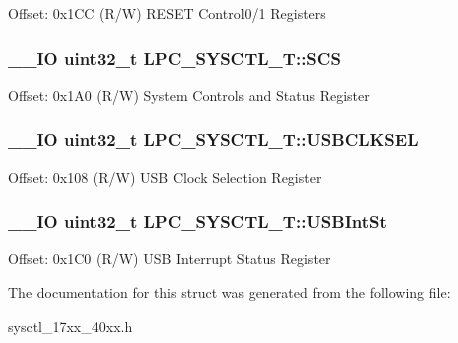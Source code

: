 Offset\+: 0x1\+C\+C (R/\+W) R\+E\+S\+E\+T Control0/1 Registers \hypertarget{struct_l_p_c___s_y_s_c_t_l___t_a90bf168dbcc04b27d230b74b5e4d17a6}{
\subsubsection[{S\+C\+S}]{\setlength{\rightskip}{0pt plus 5cm}\+\_\+\+\_\+\+I\+O uint32\+\_\+t L\+P\+C\+\_\+\+S\+Y\+S\+C\+T\+L\+\_\+\+T\+::\+S\+C\+S}}\label{struct_l_p_c___s_y_s_c_t_l___t_a90bf168dbcc04b27d230b74b5e4d17a6}
Offset\+: 0x1\+A0 (R/\+W) System Controls and Status Register \hypertarget{struct_l_p_c___s_y_s_c_t_l___t_a6d004c6e6657a7fe78e75bd3e3ea00c4}{
\subsubsection[{U\+S\+B\+C\+L\+K\+S\+E\+L}]{\setlength{\rightskip}{0pt plus 5cm}\+\_\+\+\_\+\+I\+O uint32\+\_\+t L\+P\+C\+\_\+\+S\+Y\+S\+C\+T\+L\+\_\+\+T\+::\+U\+S\+B\+C\+L\+K\+S\+E\+L}}\label{struct_l_p_c___s_y_s_c_t_l___t_a6d004c6e6657a7fe78e75bd3e3ea00c4}
Offset\+: 0x108 (R/\+W) U\+S\+B Clock Selection Register \hypertarget{struct_l_p_c___s_y_s_c_t_l___t_a0505fe464c77b1421ebbd8f9d1cd9f2a}{
\subsubsection[{U\+S\+B\+Int\+St}]{\setlength{\rightskip}{0pt plus 5cm}\+\_\+\+\_\+\+I\+O uint32\+\_\+t L\+P\+C\+\_\+\+S\+Y\+S\+C\+T\+L\+\_\+\+T\+::\+U\+S\+B\+Int\+St}}\label{struct_l_p_c___s_y_s_c_t_l___t_a0505fe464c77b1421ebbd8f9d1cd9f2a}
Offset\+: 0x1\+C0 (R/\+W) U\+S\+B Interrupt Status Register 

The documentation for this struct was generated from the following file\+:\begin{DoxyCompactItemize}
\item 
sysctl\+\_\+17xx\+\_\+40xx.\+h\end{DoxyCompactItemize}

